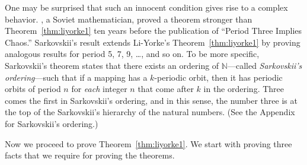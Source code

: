 \documentclass[10pt,draft,twoside]{book}
\begin{document}
One may be surprised that such an innocent condition gives rise to a complex behavior.
\citet{sarkovskii}, a Soviet mathematician, proved a theorem stronger than Theorem~\ref{thm:liyorke1} ten years before the publication of ``Period Three Implies Chaos.''
Sarkovskii's result extends Li-Yorke's Theorem~\ref{thm:liyorke1} by proving analogous results for period 5, 7, 9, \ldots, and so on.
To be more specific, Sarkovskii's theorem states that there exists an ordering of $\mathbb{N}$---called \textit{Sarkovskii's ordering}---such that if a mapping has a $k$-periodic orbit, then it has periodic orbits of period $n$ for \textit{each} integer $n$ that come after $k$ in the ordering.
Three comes the first in Sarkovskii's ordering, and in this sense, the number three is at the top of the Sarkovskii's hierarchy of the natural numbers.
(See the Appendix for Sarkovskii's ordering.)

Now we proceed to prove Theorem~\ref{thm:liyorke1}. 
We start with proving three facts that we require for proving the theorems.
\end{document}
